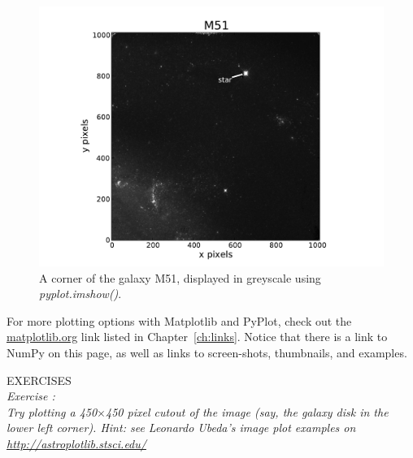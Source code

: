 \begin{figure}[H]
  \centering
    \includegraphics[scale=0.70]{M51.pdf}
    \caption{A corner of the galaxy M51, displayed in greyscale using \textit{pyplot.imshow()}.}
  \label{fig:M51}
\end{figure}

For more
plotting options with Matplotlib and PyPlot, check out the 
\href{http://matplotlib.org/}{matplotlib.org} link listed in
Chapter~\ref{ch:links}.  Notice that there is a link to NumPy on this
page, as well as links to screen-shots, thumbnails, and examples.


{\color{blue} {\sf\small EXERCISES}} \\
{\it Exercise  :  \\
Try plotting a 450$\times$450 pixel cutout of the image (say, the galaxy disk in the lower left corner).
Hint: see Leonardo Ubeda's image plot examples on \href{http://astroplotlib.stsci.edu/}
{http://astroplotlib.stsci.edu/}}


